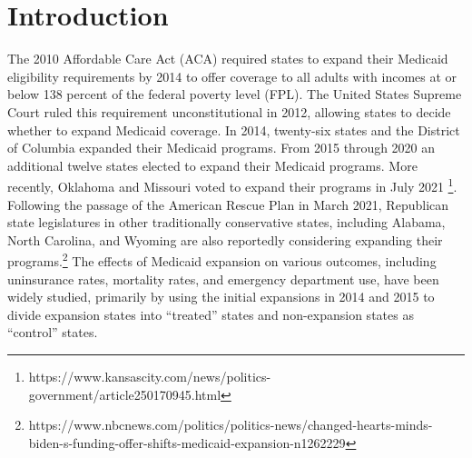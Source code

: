\documentclass[aoas]{imsart}
\theoremstyle{plain}
\theoremstyle{remark}
\begin{document}
\begin{frontmatter}
\begin{keyword}
\end{keyword}

\end{frontmatter}


\section{Introduction}

The 2010 Affordable Care Act (ACA) required states to expand their Medicaid eligibility requirements by 2014 to offer coverage to all adults with incomes at or below 138 percent of the federal poverty level (FPL). The United States Supreme Court ruled this requirement unconstitutional in 2012, allowing states to decide whether to expand Medicaid coverage. In 2014, twenty-six states and the District of Columbia expanded their Medicaid programs. From 2015 through 2020 an additional twelve states elected to expand their Medicaid programs. More recently, Oklahoma and Missouri voted to expand their programs in July 2021 \footnote{https://www.kansascity.com/news/politics-government/article250170945.html}. Following the passage of the American Rescue Plan in March 2021, Republican state legislatures in other traditionally conservative states, including Alabama, North Carolina, and Wyoming are also reportedly considering expanding their programs.\footnote{https://www.nbcnews.com/politics/politics-news/changed-hearts-minds-biden-s-funding-offer-shifts-medicaid-expansion-n1262229} The effects of Medicaid expansion on various outcomes, including uninsurance rates, mortality rates, and emergency department use, have been widely studied, primarily by using the initial expansions in 2014 and 2015 to divide expansion states into ``treated'' states and non-expansion states as ``control'' states. 
\end{document}
